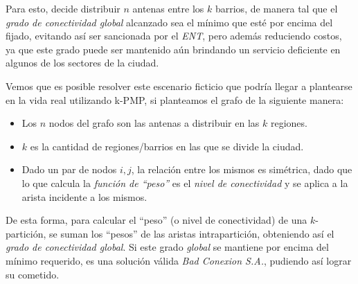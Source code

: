 Para esto, decide distribuir $n$ antenas entre los $k$ barrios, de manera tal que el \textit{grado de conectividad global} alcanzado sea el mínimo que esté por encima del fijado, evitando así ser sancionada por el \textit{ENT}, pero además reduciendo costos, ya que este grado puede ser mantenido aún brindando un servicio deficiente en algunos de los sectores de la ciudad.

Vemos que es posible resolver este escenario ficticio que podría llegar a plantearse en la vida real utilizando k-PMP, si planteamos el grafo de la siguiente manera:

\begin{itemize}
\item Los $n$ nodos del grafo son las antenas a distribuir en las $k$ regiones.

\item $k$ es la cantidad de regiones/barrios en las que se divide la ciudad.

\item Dado un par de nodos $i, j$, la relación entre los mismos es simétrica, dado que lo que calcula la \textit{función de ``peso''} es el \textit{nivel de conectividad} y se aplica a la arista incidente a los mismos.
\end{itemize}

De esta forma, para calcular el ``peso'' (o nivel de conectividad) de una $k$-partición, se suman los ``pesos'' de las aristas intrapartición, obteniendo así el \textit{grado de conectividad global}. Si este grado \textit{global} se mantiene por encima del mínimo requerido, es una solución válida \textit{Bad Conexion S.A.}, pudiendo así lograr su cometido.
